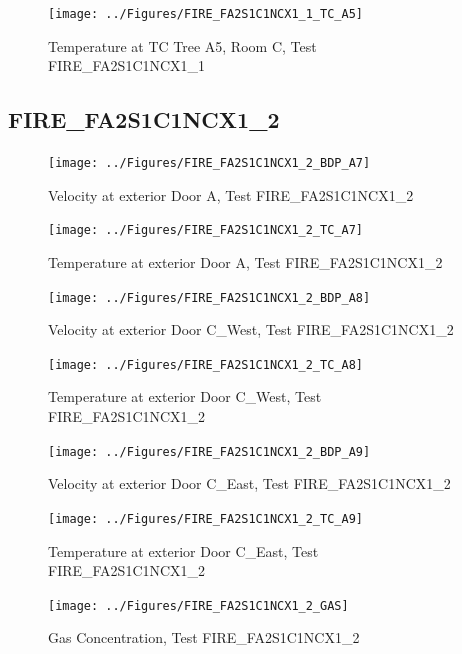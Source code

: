 \documentclass[11pt,oneside]{book}
\begin{document}
\begin{figure}[!ht]
\texttt{[image: ../Figures/FIRE\_FA2S1C1NCX1\_1\_TC\_A5]}
\caption{Temperature at TC Tree A5, Room C, Test FIRE\_FA2S1C1NCX1\_1}
\label{fig:FIRE_FA2S1C1NCX1_1_TC_A5}
\end{figure}


\clearpage


\subsection{FIRE\_FA2S1C1NCX1\_2}

\begin{figure}[!ht]
\texttt{[image: ../Figures/FIRE\_FA2S1C1NCX1\_2\_BDP\_A7]}
\caption{Velocity at exterior Door A, Test FIRE\_FA2S1C1NCX1\_2}
\label{fig:FIRE_FA2S1C1NCX1_2_BDP_A7}
\end{figure}

\begin{figure}[!ht]
\texttt{[image: ../Figures/FIRE\_FA2S1C1NCX1\_2\_TC\_A7]}
\caption{Temperature at exterior Door A, Test FIRE\_FA2S1C1NCX1\_2}
\label{fig:FIRE_FA2S1C1NCX1_2_TC_A7}
\end{figure}

\begin{figure}[!ht]
\texttt{[image: ../Figures/FIRE\_FA2S1C1NCX1\_2\_BDP\_A8]}
\caption{Velocity at exterior Door C\_West, Test FIRE\_FA2S1C1NCX1\_2}
\label{fig:FIRE_FA2S1C1NCX1_2_BDP_A8}
\end{figure}

\begin{figure}[!ht]
\texttt{[image: ../Figures/FIRE\_FA2S1C1NCX1\_2\_TC\_A8]}
\caption{Temperature at exterior Door C\_West, Test FIRE\_FA2S1C1NCX1\_2}
\label{fig:FIRE_FA2S1C1NCX1_2_TC_A8}
\end{figure}

\begin{figure}[!ht]
\texttt{[image: ../Figures/FIRE\_FA2S1C1NCX1\_2\_BDP\_A9]}
\caption{Velocity at exterior Door C\_East, Test FIRE\_FA2S1C1NCX1\_2}
\label{fig:FIRE_FA2S1C1NCX1_2_BDP_A9}
\end{figure}

\begin{figure}[!ht]
\texttt{[image: ../Figures/FIRE\_FA2S1C1NCX1\_2\_TC\_A9]}
\caption{Temperature at exterior Door C\_East, Test FIRE\_FA2S1C1NCX1\_2}
\label{fig:FIRE_FA2S1C1NCX1_2_TC_A9}
\end{figure}

\begin{figure}[!ht]
\texttt{[image: ../Figures/FIRE\_FA2S1C1NCX1\_2\_GAS]}
\caption{Gas Concentration, Test FIRE\_FA2S1C1NCX1\_2}
\label{fig:FIRE_FA2S1C1NCX1_2_GAS}
\end{figure}
\end{document}
